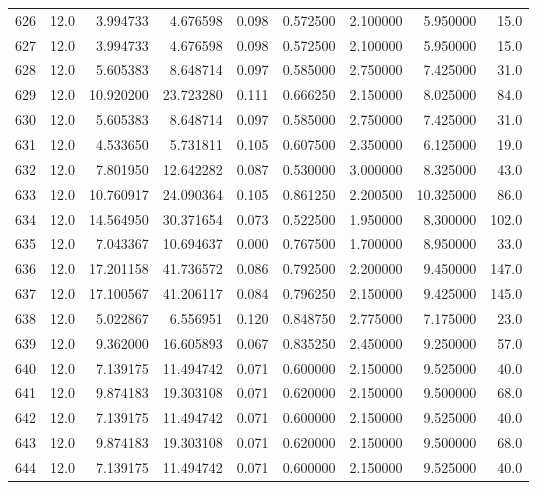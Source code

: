 \begin{tabular}{lrrrrrrrr}
626  &   12.0 &   3.994733 &   4.676598 &  0.098 &  0.572500 &  2.100000 &   5.950000 &   15.0 \\
627  &   12.0 &   3.994733 &   4.676598 &  0.098 &  0.572500 &  2.100000 &   5.950000 &   15.0 \\
628  &   12.0 &   5.605383 &   8.648714 &  0.097 &  0.585000 &  2.750000 &   7.425000 &   31.0 \\
629  &   12.0 &  10.920200 &  23.723280 &  0.111 &  0.666250 &  2.150000 &   8.025000 &   84.0 \\
630  &   12.0 &   5.605383 &   8.648714 &  0.097 &  0.585000 &  2.750000 &   7.425000 &   31.0 \\
631  &   12.0 &   4.533650 &   5.731811 &  0.105 &  0.607500 &  2.350000 &   6.125000 &   19.0 \\
632  &   12.0 &   7.801950 &  12.642282 &  0.087 &  0.530000 &  3.000000 &   8.325000 &   43.0 \\
633  &   12.0 &  10.760917 &  24.090364 &  0.105 &  0.861250 &  2.200500 &  10.325000 &   86.0 \\
634  &   12.0 &  14.564950 &  30.371654 &  0.073 &  0.522500 &  1.950000 &   8.300000 &  102.0 \\
635  &   12.0 &   7.043367 &  10.694637 &  0.000 &  0.767500 &  1.700000 &   8.950000 &   33.0 \\
636  &   12.0 &  17.201158 &  41.736572 &  0.086 &  0.792500 &  2.200000 &   9.450000 &  147.0 \\
637  &   12.0 &  17.100567 &  41.206117 &  0.084 &  0.796250 &  2.150000 &   9.425000 &  145.0 \\
638  &   12.0 &   5.022867 &   6.556951 &  0.120 &  0.848750 &  2.775000 &   7.175000 &   23.0 \\
639  &   12.0 &   9.362000 &  16.605893 &  0.067 &  0.835250 &  2.450000 &   9.250000 &   57.0 \\
640  &   12.0 &   7.139175 &  11.494742 &  0.071 &  0.600000 &  2.150000 &   9.525000 &   40.0 \\
641  &   12.0 &   9.874183 &  19.303108 &  0.071 &  0.620000 &  2.150000 &   9.500000 &   68.0 \\
642  &   12.0 &   7.139175 &  11.494742 &  0.071 &  0.600000 &  2.150000 &   9.525000 &   40.0 \\
643  &   12.0 &   9.874183 &  19.303108 &  0.071 &  0.620000 &  2.150000 &   9.500000 &   68.0 \\
644  &   12.0 &   7.139175 &  11.494742 &  0.071 &  0.600000 &  2.150000 &   9.525000 &   40.0 \\

\end{tabular}
